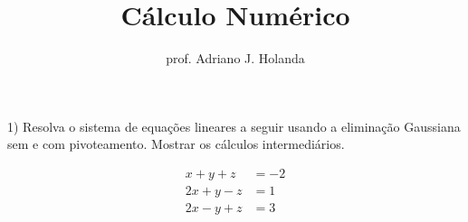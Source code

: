 \documentclass[11pt,a4paper]{article}
\begin{document}
\title{Cálculo Numérico}
\author{prof. Adriano J. Holanda}
\maketitle

1) Resolva o sistema de equações lineares a seguir 
usando a eliminação Gaussiana sem e com pivoteamento.
Mostrar os cálculos intermediários.

\begin{align*}
	x  +y  +z & =  -2 \\
	2x  +y  -z & =  1  \\
	 2x  -y  +z & =  3
\end{align*}
\end{document}
